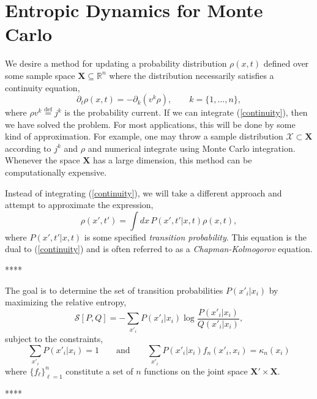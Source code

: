\documentclass{article}
\numberwithin{equation}{section}
\begin{document}
\section{Entropic Dynamics for Monte Carlo}
We desire a method for updating a probability distribution $\rho(x,t)$ defined over some sample space $\mathbf{X} \subseteq \mathbb{R}^n$ where the distribution necessarily satisfies a continuity equation,
\begin{equation}
\partial_t\rho(x,t) = -\partial_{k}(v^{k}\rho), \qquad k = \{1,\dots,n\},\label{continuity}
\end{equation}
where $\rho v^{k} \stackrel{\mathrm{def}}{=} j^{k}$ is the probability current.  If we can integrate (\ref{continuity}), then we have solved the problem.  For most applications, this will be done by some kind of approximation.  For example, one may throw a sample distribution $\mathcal{X} \subset \mathbf{X}$ according to $j^{k}$ and $\rho$ and numerical integrate using Monte Carlo integration. Whenever the space $\mathbf{X}$ has a large dimension, this method can be computationally expensive.  

Instead of integrating (\ref{continuity}), we will take a different approach and attempt to approximate the expression,
\begin{equation}
\rho(x',t') = \int dx\, P(x',t'|x,t)\rho(x,t),
\end{equation}
where $P(x',t'|x,t)$ is some specified \textit{transition probability}.  This equation is the dual to (\ref{continuity}) and is often referred to as a \textit{Chapman-Kolmogorov} equation.


****

The goal is to determine the set of transition probabilities $P(x'_i|x_i)$ by maximizing the relative entropy,
\begin{equation}
\mathcal{S}[P,Q] = -\sum_{x'_i}P(x'_i|x_i)\log\frac{P(x'_i|x_i)}{Q(x'_i|x_i)},
\end{equation}
subject to the constraints,
\begin{equation}
\sum_{x'_i}P(x'_i|x_i) = 1 \qquad \mathrm{and} \qquad \sum_{x'_i}P(x'_i|x_i)f_n(x'_i,x_i) = \kappa_n(x_i)
\end{equation}
where $\{f_{\ell}\}_{\ell=1}^n$ constitute a set of $n$ functions on the joint space $\mathbf{X}'\times\mathbf{X}$.

****
\end{document}
